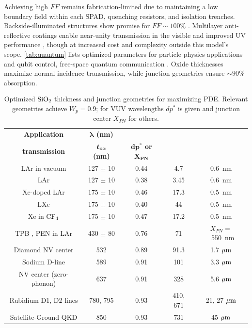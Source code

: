 Achieving high $FF$ remains fabrication-limited due to maintaining a low boundary field within each SPAD, quenching resistors, and isolation trenches. Backside-illuminated structures show promise for $FF \sim 100\%$ \cite{ninkovic_avalanche_2007}. Multilayer anti-reflective coatings enable near-unity transmission in the visible and improved UV performance \cite{uvMulti_Hamden2011, JIA_solarcells_broadband_2017, solar_multilayer_review, multilayer_2005}, though at increased cost and complexity outside this model's scope. \autoref{tab:quantum} lists optimized parameters for particle physics applications and qubit control, free-space quantum communication \cite{liao_satellite--ground_2017}. Oxide thicknesses maximize normal-incidence transmission, while junction geometries ensure $\sim90\%$ absorption.
\begin{table}[ht!]
\centering
\caption{\label{tab:quantum} Optimized $\sio$ thickness and junction geometries for maximizing PDE. Relevant geometries achieve $W_p=0.9$; for VUV wavelengths $dp^*$ is given and junction center $X_{PN}$ for others.}
\smallskip
\renewcommand{\arraystretch}{1.3}  %
{\footnotesize
\begin{tabular}{|c|c|c|c|c|}
\hline
\textbf{Application} & \textbf{{$\bm{\lambda}$ (nm)}} & \makecell{\textbf{Maximum}\\\textbf{transmission}} & \textbf{$\bm{t_{ox}}$ (nm)} & \textbf{$\bm{dp^*}$ or $\bm{X_{PN}}$} \\
\Xhline{3\arrayrulewidth}
LAr in vacuum & 127 $\pm$ 10 & 0.44 & 4.7 & 0.6~nm \\ \hline
LAr           & 127 $\pm$ 10 & 0.38 & 3.45 & 0.6~nm \\ \hline
Xe-doped LAr  & 175 $\pm$ 10 & 0.46 & 17.3 & 0.5~nm \\ \hline
LXe           & 175 $\pm$ 10 & 0.40 & 44 & 0.5~nm \\ \hline
Xe in $\ce{CF_4}$ & 175 $\pm$ 10 & 0.47 & 17.2 & 0.5~nm \\ \hline
TPB \cite{TPB_Francini_2013}, PEN \cite{PEN_Kuniak2019} in LAr & 430 $\pm$ 80 & 0.76 & 71 & \small{$X_{PN}=$~550~nm} \\
\Xhline{3\arrayrulewidth}
Diamond NV center \cite{childress_diamond_2013} & 532 & 0.89 & 91.3 & 1.7 $\mu\text{m}$ \\ \hline
Sodium D-line & 589 & 0.91 & 101  & 3.3 $\mu\text{m}$ \\ \hline
NV center (zero-phonon) \cite{NV_zerophonon} & 637 & 0.91 & 328  & 5.6 $\mu\text{m}$ \\ \hline
Rubidium D1, D2 lines \cite{mottola_optical_2023} & 780, 795 & 0.93 & 410, 671 & 21, 27 $\mu\text{m}$ \\ \hline
Satellite-Ground QKD \cite{liao_satellite--ground_2017} & 850 & 0.93 & 731  & 45 $\mu\text{m}$ \\
\hline
\end{tabular}
} %
\end{table}


